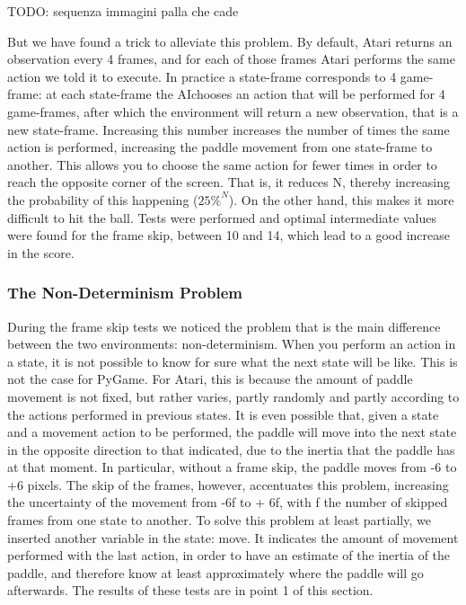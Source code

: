 \smallskip
TODO: sequenza immagini palla che cade
\smallskip

But we have found a trick to alleviate this problem. By default, Atari returns an observation every 4 frames, and for each of those frames Atari performs the same action we told it to execute. In practice a state-frame corresponds to 4 game-frame: at each state-frame the AI ​​chooses an action that will be performed for 4 game-frames, after which the environment will return a new observation, that is a new state-frame. Increasing this number increases the number of times the same action is performed, increasing the paddle movement from one state-frame to another. This allows you to choose the same action for fewer times in order to reach the opposite corner of the screen. That is, it reduces N, thereby increasing the probability of this happening ($25\%^{N}$). On the other hand, this makes it more difficult to hit the ball. Tests were performed and optimal intermediate values ​​were found for the frame skip, between 10 and 14, which lead to a good increase in the score.

\subsubsection{The Non-Determinism Problem}

During the frame skip tests we noticed the problem that is the main difference between the two environments: non-determinism. When you perform an action in a state, it is not possible to know for sure what the next state will be like. This is not the case for PyGame. For Atari, this is because the amount of paddle movement is not fixed, but rather varies, partly randomly and partly according to the actions performed in previous states. It is even possible that, given a state and a movement action to be performed, the paddle will move into the next state in the opposite direction to that indicated, due to the inertia that the paddle has at that moment. In particular, without a frame skip, the paddle moves from -6 to +6 pixels. The skip of the frames, however, accentuates this problem, increasing the uncertainty of the movement from -6f to + 6f, with f the number of skipped frames from one state to another. To solve this problem at least partially, we inserted another variable in the state: move. It indicates the amount of movement performed with the last action, in order to have an estimate of the inertia of the paddle, and therefore know at least approximately where the paddle will go afterwards. The results of these tests are in point 1 of this section.

